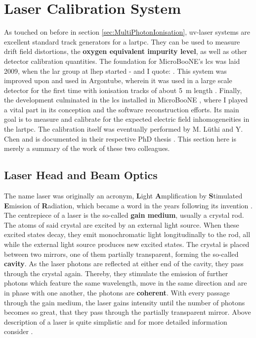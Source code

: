 \section{Laser Calibration System} \label{sec:LaserCalibrationSystem}
As touched on before in section \ref{sec:MultiPhotonIonisation}, \gls{uv}-laser systems are excellent standard track generators for a \gls{lartpc}. They can be used to measure drift field distortions, the \textbf{oxygen equivalent impurity level}, as well as other detector calibration quantities. The foundation for MicroBooNE's \gls{lcs} was laid 2009, when the \gls{lar} group at \gls{lhep} started - and I quote: \cite[\textit{the development of a novel online monitoring and calibration system exploiting UV-laser beams}]{LArLaserLHEP}. This system was improved upon and used in Argontube, wherein it was used in a large scale detector for the first time with ionisation tracks of about \SI{5}{\metre} length \cite{Argontube3}. Finally, the development culminated in the \gls{lcs} installed in MicroBooNE \cite{LArLaserMicroBooNE1,LArLaserMicroBooNE2}, where I played a vital part in its conception and the software reconstruction efforts. Its main goal is to measure and calibrate for the expected electric field inhomogeneities in the \gls{lartpc}. The calibration itself was eventually performed by M. L\"uthi and Y. Chen and is documented in their respective PhD thesis \cite{LArLaserPhDMatthias,LArLaserPhDYifan}. This section here is merely a summary of the work of these two colleagues.

\subsection{Laser Head and Beam Optics}
The name laser was originally an acronym, \textbf{L}ight \textbf{A}mplification by \textbf{S}timulated \textbf{E}mission of \textbf{R}adiation, which became a word in the years following its invention \cite{LaserFirst}. The centrepiece of a laser is the so-called \textbf{gain medium}, usually a crystal rod. The atoms of said crystal are excited by an external light source. When these excited states decay, they emit monochromatic light longitudinally to the rod, all while the external light source produces new excited states. The crystal is placed between two mirrors, one of them partially transparent, forming the so-called \textbf{cavity}. As the laser photons are reflected at either end of the cavity, they pass through the crystal again. Thereby, they stimulate the emission of further photons which feature the same wavelength, move in the same direction and are in phase with one another, \ie the photons are \textbf{coherent}. With every passage through the gain medium, the laser gains intensity until the number of photons becomes so great, that they pass through the partially transparent mirror. Above description of a laser is quite simplistic and for more detailed information consider \cite{LaserTheory}. 

